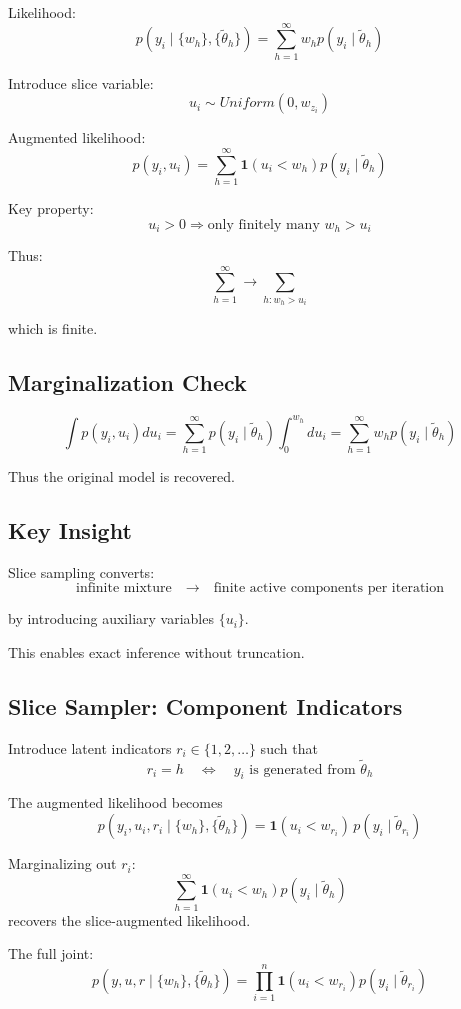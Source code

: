 \documentclass[12pt,oneside]{book}
\numberwithin{equation}{section}
\theoremstyle{definition}
\theoremstyle{plain}
\theoremstyle{remark}
\begin{document}
Likelihood:
\[
p(y_i \mid \{w_h\}, \{\tilde{\theta}_h\}) = \sum_{h=1}^\infty w_h p(y_i \mid \tilde{\theta}_h)
\]

Introduce slice variable:
\[
u_i \sim Uniform(0, w_{z_i})
\]

Augmented likelihood:
\[
p(y_i, u_i) = \sum_{h=1}^\infty \mathbf{1}(u_i < w_h) p(y_i \mid \tilde{\theta}_h)
\]

Key property:
\[
u_i > 0 \Rightarrow \text{only finitely many } w_h > u_i
\]

Thus:
\[
\sum_{h=1}^\infty \rightarrow \sum_{h: w_h > u_i}
\]

which is finite.

\subsection*{Marginalization Check}

\[
\int p(y_i, u_i) du_i
=
\sum_{h=1}^\infty p(y_i \mid \tilde{\theta}_h) \int_0^{w_h} du_i
=
\sum_{h=1}^\infty w_h p(y_i \mid \tilde{\theta}_h)
\]

Thus the original model is recovered.

\subsection*{Key Insight}

Slice sampling converts:
\[
\text{infinite mixture} \quad \rightarrow \quad \text{finite active components per iteration}
\]

by introducing auxiliary variables $\{u_i\}$.

This enables exact inference without truncation.

\subsection*{Slice Sampler: Component Indicators}

Introduce latent indicators $r_i \in \{1,2,\dots\}$ such that
\[
r_i = h \quad \Longleftrightarrow \quad y_i \text{ is generated from } \tilde{\theta}_h
\]

The augmented likelihood becomes
\[
p(y_i, u_i, r_i \mid \{w_h\}, \{\tilde{\theta}_h\})
=
\mathbf{1}(u_i < w_{r_i}) \, p(y_i \mid \tilde{\theta}_{r_i})
\]

Marginalizing out $r_i$:
\[
\sum_{h=1}^\infty \mathbf{1}(u_i < w_h) p(y_i \mid \tilde{\theta}_h)
\]
recovers the slice-augmented likelihood.

The full joint:
\[
p(y, u, r \mid \{w_h\}, \{\tilde{\theta}_h\})
=
\prod_{i=1}^n \mathbf{1}(u_i < w_{r_i}) p(y_i \mid \tilde{\theta}_{r_i})
\]
\end{document}
